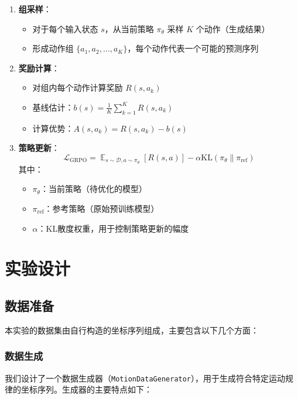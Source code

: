 \documentclass[a4paper, 12pt]{article}
\DeclareMathOperator*{\E}{\mathbb{E}}    %
\newcommand{\KL}{\text{KL}}              %
\begin{document}
\begin{enumerate}
    \item \textbf{组采样}：
        \begin{itemize}
            \item 对于每个输入状态 $s$，从当前策略 $\pi_\theta$ 采样 $K$ 个动作（生成结果）
            \item 形成动作组 $\{a_1, a_2, ..., a_K\}$，每个动作代表一个可能的预测序列
        \end{itemize}
    
    \item \textbf{奖励计算}：
        \begin{itemize}
            \item 对组内每个动作计算奖励 $R(s,a_k)$
            \item 基线估计：$b(s) = \frac{1}{K}\sum_{k=1}^K R(s,a_k)$
            \item 计算优势：$A(s,a_k) = R(s,a_k) - b(s)$
        \end{itemize}
    
    \item \textbf{策略更新}：
        \begin{equation}
            \mathcal{L}_{\text{GRPO}} = \E_{s \sim \mathcal{D}, a \sim \pi_\theta}[R(s,a)] - \alpha \KL(\pi_\theta \| \pi_{\text{ref}})
        \end{equation}
        其中：
        \begin{itemize}
            \item $\pi_\theta$：当前策略（待优化的模型）
            \item $\pi_{\text{ref}}$：参考策略（原始预训练模型）
            \item $\alpha$：KL散度权重，用于控制策略更新的幅度
        \end{itemize}
\end{enumerate}

\section{实验设计}
\subsection{数据准备}
本实验的数据集由自行构造的坐标序列组成，主要包含以下几个方面：

\subsubsection{数据生成}
我们设计了一个数据生成器（\texttt{MotionDataGenerator}），用于生成符合特定运动规律的坐标序列。生成器的主要特点如下：
\end{document}
